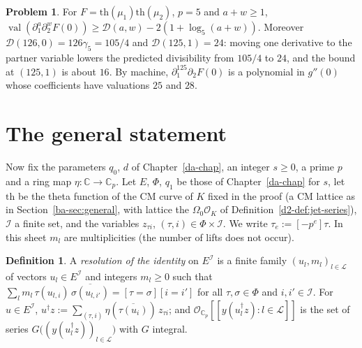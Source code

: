 \documentclass[reqno]{amsart}
\newcounter{chap}
\theoremstyle{plain}
\theoremstyle{definition}
\newtheorem{problem}{Problem}[section]
\newtheorem{definition}[theorem]{Definition}
\theoremstyle{remark}
\newcommand{\C}{\mathbb{C}}
\newcommand{\Oc}{\mathcal{O}}
\newcommand{\Op}{\mathcal{O}_{\C_p}}
\newcommand{\val}{\operatorname{val}}
\newcommand{\Dc}{\mathcal{D}}
\newcommand{\tth}{\mathrm{th}}
\begin{document}
\begin{problem}\label{pr:pair-count}
For \(F = \tth(\mu_1)\tth(\mu_2)\), \(p = 5\) and \(a + w \ge 1\), \(\val(\partial_1^a\partial_2^w F(0)) \ge \Dc(a, w) - 2(1 + \log_5(a+w))\).  Moreover \(\Dc(126, 0) = 126\gamma_5 = 105/4\) and \(\Dc(125, 1) = 24\): moving one derivative to the partner variable lowers the predicted divisibility from \(105/4\) to \(24\), and the bound at \((125, 1)\) is about \(16\).  By machine, \(\partial_1^{125}\partial_2 F(0)\) is a polynomial in \(g''(0)\) whose coefficients have valuations \(25\) and \(28\).
\end{problem}

\section{The general statement}\label{sec:general}

Now fix the parameters \(q_0\), \(d\) of Chapter~\ref{da-chap}, an integer \(s \ge 0\), a prime \(p\) and a ring map \(\eta\colon \C \to \C_p\).  Let \(E\), \(\Phi\), \(q_1\) be those of Chapter~\ref{da-chap} for \(s\), let \(\tth\) be the theta function of the CM curve of \(K\) fixed in the proof (a CM lattice as in Section~\ref{ba-sec:general}, with lattice the \(\Omega_0\Oc_K\) of Definition~\ref{d2-def:jet-series}), \(\mathcal I\) a finite set, and the variables \(z_{\tau i}\), \((\tau, i) \in \Phi \times \mathcal I\).  We write \(\tau_e := [-p^e]\tau\).  In this sheet \(m_l\) are multiplicities (the number of lifts does not occur).

\begin{definition}\label{def:resolution}
A \emph{resolution of the identity} on \(E^{\mathcal I}\) is a finite family \((u_l, m_l)_{l \in \mathcal L}\) of vectors \(u_l \in E^{\mathcal I}\) and integers \(m_l \ge 0\) such that \(\sum_{l} m_l\,\tau(u_{l,i})\,\overline{\sigma(u_{l,i'})} = [\tau = \sigma][i = i']\) for all \(\tau, \sigma \in \Phi\) and \(i, i' \in \mathcal I\).  For \(u \in E^{\mathcal I}\), \(u^\dagger z := \sum_{(\tau, i)} \eta(\overline{\tau(u_i)})\, z_{\tau i}\); and \(\Op[[y(u_l^\dagger z) : l \in \mathcal L]]\) is the set of series \(G\bigl((y(u_l^\dagger z))_{l \in \mathcal L}\bigr)\) with \(G\) integral.
\end{definition}
\end{document}
